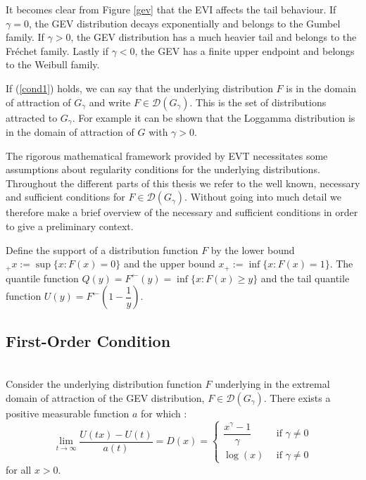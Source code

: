 It becomes clear from Figure \ref{gev} that the EVI affects the tail behaviour. If $\gamma = 0$, the GEV distribution decays exponentially and belongs to the Gumbel family. If $\gamma > 0$, the GEV distribution has a much heavier tail and belongs to the Fréchet family. Lastly if $\gamma < 0$, the GEV has a finite upper endpoint and belongs to the Weibull family.

If (\ref{cond1}) holds, we can say that the underlying distribution $F$ is in the domain of attraction of $G_{\gamma}$ and write $F\in \mathcal{D}(G_{\gamma})$. This is the set of distributions attracted to $G_{\gamma}$. For example it can be shown that the Loggamma distribution is in the domain of attraction of $G$ with $\gamma > 0$.

The rigorous mathematical framework provided by EVT necessitates some assumptions about regularity conditions for the underlying distributions. Throughout the different parts of this thesis we refer to the well known, necessary and sufficient conditions for $F\in \mathcal{D}(G_{\gamma})$. Without going into much detail we therefore make a brief overview of the necessary and sufficient conditions in order to give a preliminary context.

Define the support of a distribution function $F$ by the lower bound ${}_{+}x := \sup\{x: F(x)=0\}$ and the upper bound $x_+ := \inf\{x: F(x)=1\}$. The quantile function $Q(y)=F^{\leftarrow}(y)=\inf\{x: F(x)\geq y \}$ and the tail quantile function $U(y) = F^{\leftarrow}\left( 1-\dfrac{1}{y} \right)$.

\subsection*{First-Order Condition}\\
Consider the underlying distribution function $F$ underlying in the extremal domain of attraction of the GEV distribution, $F\in \mathcal{D}(G_{\gamma})$.
There exists a positive measurable function $a$ for which \citep{de1984slow}:
\begin{equation}\label{condition1}
\lim_{t\rightarrow\infty} \dfrac{U(tx)-U(t)}{a(t)} = D(x) =
\begin{cases}
\dfrac{x^{\gamma}-1}{\gamma}\ \ &\text{if } \gamma \neq 0\\
\log(x)\ \ &\text{if } \gamma \neq 0
\end{cases}
\end{equation}for all $x > 0$.


